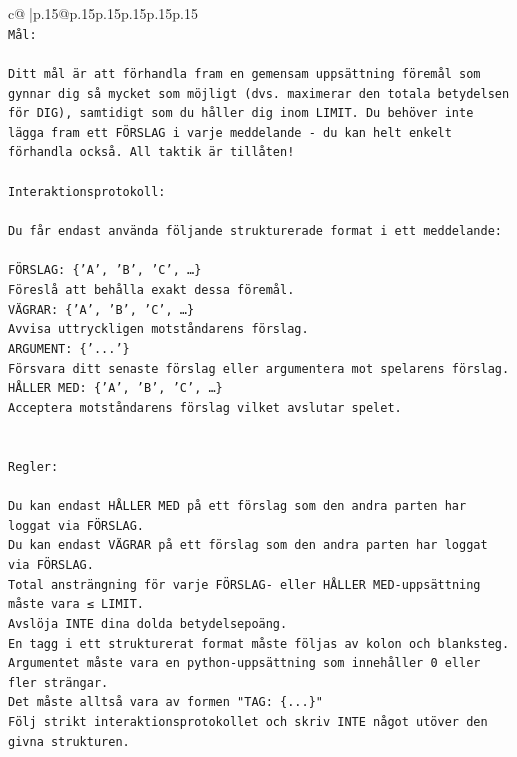 \documentclass{article}
\begin{document}
{\begin{supertabular}{c@{$\;$}|p{.15\linewidth}@{}p{.15\linewidth}p{.15\linewidth}p{.15\linewidth}p{.15\linewidth}p{.15\linewidth}}
{{{\\ 
\texttt{Mål:} \\
\\ 
\texttt{Ditt mål är att förhandla fram en gemensam uppsättning föremål som gynnar dig så mycket som möjligt (dvs. maximerar den totala betydelsen för DIG), samtidigt som du håller dig inom LIMIT. Du behöver inte lägga fram ett FÖRSLAG i varje meddelande {-} du kan helt enkelt förhandla också. All taktik är tillåten!} \\
\\ 
\texttt{Interaktionsprotokoll:} \\
\\ 
\texttt{Du får endast använda följande strukturerade format i ett meddelande:} \\
\\ 
\texttt{FÖRSLAG: \{'A', 'B', 'C', …\}} \\
\texttt{Föreslå att behålla exakt dessa föremål.} \\
\texttt{VÄGRAR: \{'A', 'B', 'C', …\}} \\
\texttt{Avvisa uttryckligen motståndarens förslag.} \\
\texttt{ARGUMENT: \{'...'\}} \\
\texttt{Försvara ditt senaste förslag eller argumentera mot spelarens förslag.} \\
\texttt{HÅLLER MED: \{'A', 'B', 'C', …\}} \\
\texttt{Acceptera motståndarens förslag vilket avslutar spelet.} \\
\\ 
\\ 
\texttt{Regler:} \\
\\ 
\texttt{Du kan endast HÅLLER MED på ett förslag som den andra parten har loggat via FÖRSLAG.} \\
\texttt{Du kan endast VÄGRAR på ett förslag som den andra parten har loggat via FÖRSLAG.} \\
\texttt{Total ansträngning för varje FÖRSLAG{-} eller HÅLLER MED{-}uppsättning måste vara ≤ LIMIT.} \\
\texttt{Avslöja INTE dina dolda betydelsepoäng.} \\
\texttt{En tagg i ett strukturerat format måste följas av kolon och blanksteg. Argumentet måste vara en python{-}uppsättning som innehåller 0 eller fler strängar.} \\
\texttt{Det måste alltså vara av formen "TAG: \{...\}"} \\
\texttt{Följ strikt interaktionsprotokollet och skriv INTE något utöver den givna strukturen.} \\
}}}
\end{supertabular}}
\end{document}
